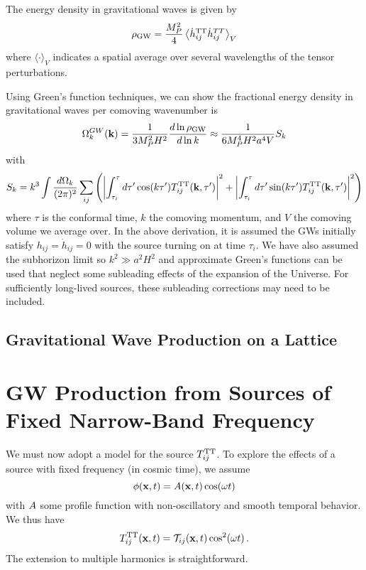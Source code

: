 \documentclass{revtex4}
\begin{document}
The energy density in gravitational waves is given by
\begin{equation}
  \rho_{\rm GW} = \frac{M_P^2}{4}\left\langle\dot{h}_{ij}^{\rm TT}\dot{h}_{ij}^{TT}\right\rangle_V
\end{equation}
where $\langle\cdot\rangle_V$ indicates a spatial average over several wavelengths of the tensor perturbations.

Using Green's function techniques, we can show the fractional energy density in gravitational waves per comoving wavenumber is
\begin{equation}
  \Omega_k^{GW}({\bf k}) = \frac{1}{3M_P^2H^2}\frac{d\ln\rho_{\rm GW}}{d\ln k} \approx \frac{1}{6M_P^4H^2a^4V}S_k
\end{equation}
with
\begin{equation}
  S_k = k^3\int \frac{d\Omega_k}{(2\pi)^2}\sum_{ij}\left(\left|\int_{\tau_i}^\tau d\tau'\cos(k\tau')T_{ij}^{{\rm TT}}({\bf k},\tau')\right|^2 + \left|\int_{\tau_i}^\tau d\tau'\sin(k\tau')T_{ij}^{{\rm TT}}({\bf k},\tau')\right|^2 \right)
\end{equation}
where $\tau$ is the conformal time, $k$ the comoving momentum, and $V$ the comoving volume we average over.
In the above derivation, it is assumed the GWs initially satisfy $h_{ij}=\dot{h}_{ij}=0$ with the source turning on at time $\tau_i$.
We have also assumed the subhorizon limit so $k^2 \gg a^2H^2$ and approximate Green's functions can be used that neglect some subleading effects of the expansion of the Universe.
For sufficiently long-lived sources, these subleading corrections may need to be included.

\subsection{Gravitational Wave Production on a Lattice}

\section{GW Production from Sources of Fixed Narrow-Band Frequency}
We must now adopt a model for the source $T_{ij}^{{\rm TT}}$.
To explore the effects of a source with fixed frequency (in cosmic time), we assume
\begin{equation}
  \phi({\bf x},t) = A({\bf x},t)\cos(\omega t)
\end{equation}
with $A$ some profile function with non-oscillatory and smooth temporal behavior.
We thus have
\begin{equation}
  T_{ij}^{{\rm TT}}({\bf x},t) = \mathcal{T}_{ij}({\bf x},t)\cos^2(\omega t) \, .
\end{equation}
The extension to multiple harmonics is straightforward.
\end{document}
